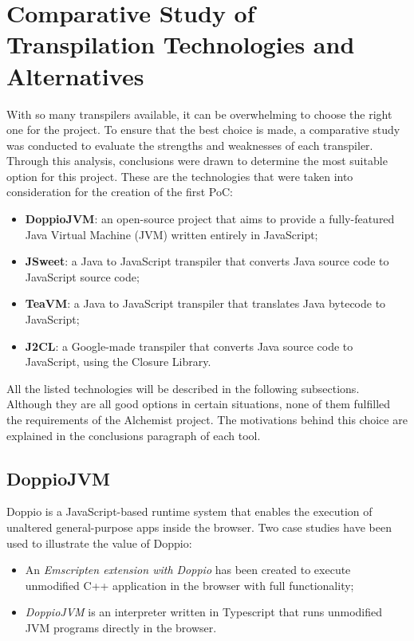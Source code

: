 \section{Comparative Study of Transpilation Technologies and Alternatives}
\label{sec:comparative-study-of-transpilation-technologies-and-alternatives}
With so many transpilers available, it can be overwhelming to choose the right one for the project.  To ensure that the best choice is made, a comparative study was conducted to evaluate the strengths and weaknesses of each transpiler.  Through this analysis, conclusions were drawn to determine the most suitable option for this project. These are the technologies that were taken into consideration for the creation of the first PoC:
\begin{itemize}
	\item \textbf{DoppioJVM}: an open-source project that aims to provide a fully-featured Java Virtual Machine (JVM) written entirely in JavaScript;
	\item \textbf{JSweet}: a Java to JavaScript transpiler that converts Java source code to JavaScript source code;
	\item \textbf{TeaVM}: a Java to JavaScript transpiler that translates Java bytecode to JavaScript;
	\item \textbf{J2CL}: a Google-made transpiler that converts Java source code to JavaScript, using the Closure Library.
\end{itemize}
All the listed technologies will be described in the following subsections. Although they are all good options in certain situations, none of them fulfilled the requirements of the Alchemist project. The motivations behind this choice are explained in the conclusions paragraph of each tool.
\subsection{DoppioJVM}
\label{ssec:doppiojvm}
Doppio is a JavaScript-based runtime system that enables the execution of unaltered general-purpose apps inside the browser. Two case studies have been used to illustrate the value of Doppio:
\begin{itemize}
	\item An \emph{Emscripten extension with Doppio} has been created to execute unmodified C++ application in the browser with full functionality;
	\item \emph{DoppioJVM} is an interpreter written in Typescript that runs unmodified JVM programs directly in the browser.
\end{itemize}

